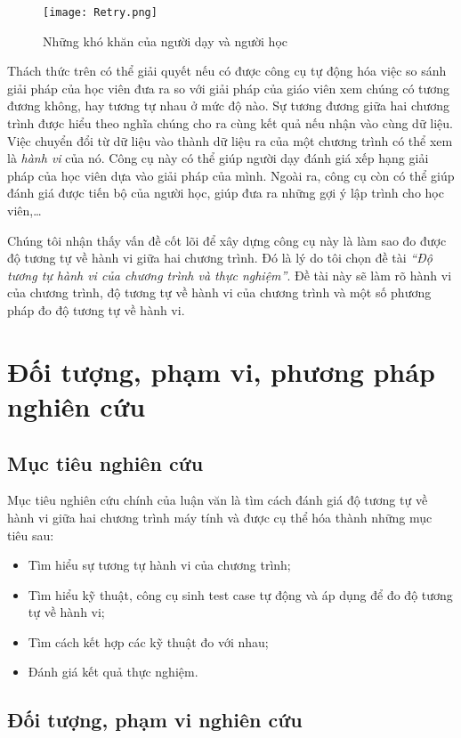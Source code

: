 \begin{figure}[h]
	\centering
	\texttt{[image: Retry.png]}
	\caption{Những khó khăn của người dạy và người học}
	\label{fig:Retry}		
\end{figure}

Thách thức trên có thể giải quyết nếu có được công cụ tự động hóa việc
so sánh giải pháp của học viên đưa ra so với giải pháp của giáo viên
xem chúng có tương đương không, hay tương tự nhau ở mức độ nào. Sự
tương đương giữa hai chương trình được hiểu theo nghĩa chúng cho ra
cùng kết quả nếu nhận vào cùng dữ liệu. Việc chuyển đổi từ dữ liệu vào
thành dữ liệu ra của một chương trình có thể xem là \emph{hành vi} của
nó. Công cụ này có thể giúp người dạy đánh giá xếp hạng giải pháp của
học viên dựa vào giải pháp của mình. Ngoài ra, công cụ còn có thể giúp
đánh giá được tiến bộ của người học, giúp đưa ra những gợi ý lập
trình cho học viên,\dots

Chúng tôi nhận thấy vấn đề cốt lõi để xây dựng công cụ này là làm sao
đo được độ tương tự về hành vi giữa hai chương trình. Đó là lý do tôi 
chọn đề tài \emph{``Độ tương tự hành vi của chương trình và thực nghiệm''}. 
Đề tài này sẽ làm rõ hành vi của chương trình, độ tương tự về hành vi của 
chương trình và một số phương pháp đo độ tương tự về hành vi.

\section{Đối tượng, phạm vi, phương pháp nghiên cứu}
\subsection{Mục tiêu nghiên cứu}

Mục tiêu nghiên cứu chính của luận văn là tìm cách đánh giá độ tương tự về 
hành vi giữa hai chương trình máy tính và được cụ thể hóa thành những mục tiêu sau:
\begin{itemize}
\item Tìm hiểu sự tương tự hành vi của chương trình;
\item Tìm hiểu kỹ thuật, công cụ sinh test case tự động và áp dụng để
  đo độ tương tự về hành vi;
\item Tìm cách kết hợp các kỹ thuật đo với nhau;
\item Đánh giá kết quả thực nghiệm.
\end{itemize}

\subsection{Đối tượng, phạm vi nghiên cứu}


